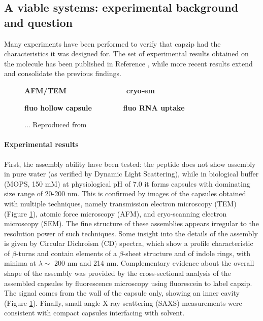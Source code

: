 
\subsection{A viable systems: experimental background and question}
Many experiments have been performed to verify that capzip had the characteristics it was designed for. The set of experimental results obtained on the molecule has been published in Reference \citep{Castelletto2016}, while more recent results extend and consolidate the previous findings.

\begin{figure}
\begin{center}
\textbf{AFM/TEM \ \ \ \ \ \ \ \ \ \ \ \ \ \ cryo-em}
\bigskip

\textbf{fluo hollow capsule \ \ \ \ \ \ \ fluo RNA uptake}
\caption[Experimental results on capzip]{... Reproduced from \citep{Castelletto2016}} \label{fig:exp_capzip}
\end{center}
\end{figure}

\paragraph{Experimental results} First, the assembly ability have been tested: the peptide does not show assembly in pure water (as verified by Dynamic Light Scattering), while in biological buffer (MOPS, 150 mM) at physiological pH of 7.0 it forms capsules with dominating size range of 20-200 nm. This is confirmed by images of the capsules obtained with multiple techniques, namely transmission electron microscopy (TEM) (Figure \ref{fig:exp_capzip}), atomic force microscopy (AFM), and cryo-scanning electron microscopy (SEM).
%
The fine structure of these assemblies appears irregular to the resolution power of such techniques. Some insight into the details of the assembly is given by Circular Dichroism (CD) spectra, which show a profile characteristic of $\beta$-turns and contain elements of a $\beta$-sheet structure and of indole rings, with minima at $\lambda \sim$ 200 nm and 214 nm.
%
Complementary evidence about the overall shape of the assembly was provided by the cross-sectional analysis of the assembled capsules by fluorescence microscopy using fluorescein to label capzip. The signal comes from the wall of the capsule only, showing an inner cavity (Figure \ref{fig:exp_capzip}).
%
Finally, small angle X-ray scattering (SAXS) measurements were consistent with compact capsules interfacing with solvent.

